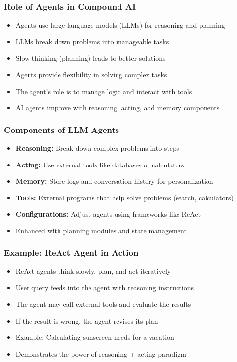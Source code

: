 \begin{frame}[fragile]\frametitle{Role of Agents in Compound AI}
\begin{itemize}
    \item Agents use large language models (LLMs) for reasoning and planning
    \item LLMs break down problems into manageable tasks
    \item Slow thinking (planning) leads to better solutions
    \item Agents provide flexibility in solving complex tasks
    \item The agent's role is to manage logic and interact with tools
    \item AI agents improve with reasoning, acting, and memory components
\end{itemize}
\end{frame}

\begin{frame}[fragile]\frametitle{Components of LLM Agents}
\begin{itemize}
    \item \textbf{Reasoning:} Break down complex problems into steps
    \item \textbf{Acting:} Use external tools like databases or calculators
    \item \textbf{Memory:} Store logs and conversation history for personalization
    \item \textbf{Tools:} External programs that help solve problems (search, calculators)
    \item \textbf{Configurations:} Adjust agents using frameworks like ReAct
    \item Enhanced with planning modules and state management
\end{itemize}
\end{frame}

\begin{frame}[fragile]\frametitle{Example: ReAct Agent in Action}
\begin{itemize}
    \item ReAct agents think slowly, plan, and act iteratively
    \item User query feeds into the agent with reasoning instructions
    \item The agent may call external tools and evaluate the results
    \item If the result is wrong, the agent revises its plan
    \item Example: Calculating sunscreen needs for a vacation
    \item Demonstrates the power of reasoning + acting paradigm
\end{itemize}
\end{frame}

